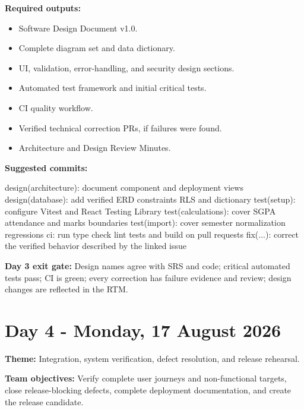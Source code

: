 \documentclass[
  10pt,
  a4paper,
  oneside]{report}
\newenvironment{Shaded}{}{}
\newcommand{\NormalTok}[1]{#1}
\providecommand{\tightlist}{%
  \setlength{\itemsep}{0pt}\setlength{\parskip}{0pt}}
\begin{document}
\textbf{Required outputs:}

\begin{itemize}
\tightlist
\item
  Software Design Document v1.0.
\item
  Complete diagram set and data dictionary.
\item
  UI, validation, error-handling, and security design sections.
\item
  Automated test framework and initial critical tests.
\item
  CI quality workflow.
\item
  Verified technical correction PRs, if failures were found.
\item
  Architecture and Design Review Minutes.
\end{itemize}

\textbf{Suggested commits:}

\begin{Shaded}
\begin{Highlighting}[]
\NormalTok{design(architecture): document component and deployment views}
\NormalTok{design(database): add verified ERD constraints RLS and dictionary}
\NormalTok{test(setup): configure Vitest and React Testing Library}
\NormalTok{test(calculations): cover SGPA attendance and marks boundaries}
\NormalTok{test(import): cover semester normalization regressions}
\NormalTok{ci: run type check lint tests and build on pull requests}
\NormalTok{fix(...): correct the verified behavior described by the linked issue}
\end{Highlighting}
\end{Shaded}

\textbf{Day 3 exit gate:} Design names agree with SRS and code; critical
automated tests pass; CI is green; every correction has failure evidence
and review; design changes are reflected in the RTM.

\section{Day 4 - Monday, 17 August
2026}\label{day-4---monday-17-august-2026}

\textbf{Theme:} Integration, system verification, defect resolution, and
release rehearsal.

\textbf{Team objectives:} Verify complete user journeys and
non-functional targets, close release-blocking defects, complete
deployment documentation, and create the release candidate.
\end{document}

